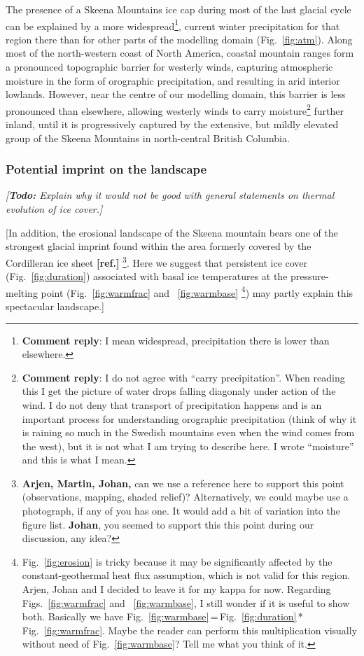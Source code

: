 \documentclass[tc, manuscript]{copernicus}
\newcommand{\renote}[1]{\footnote{\textbf{Comment reply}: #1}}
\newcommand{\todo}[1]{\emph{[\textbf{Todo:} #1]}}
\newcommand{\aref}[0]{\textbf{[ref.]}}
\begin{document}
The presence of a Skeena Mountains ice cap during most of the last glacial
cycle can be explained by a more widespread\renote{
    I mean widespread, precipitation there is lower than elsewhere.},
current winter precipitation for that region there than for other parts of the
modelling domain (Fig.~\ref{fig:atm}). Along most of the north-western coast of
North America, coastal mountain ranges form a pronounced topographic barrier
for westerly winds, capturing atmospheric moisture in the form of orographic
precipitation, and resulting in arid interior lowlands. However, near the
centre of our modelling domain, this barrier is less pronounced than elsewhere,
allowing westerly winds to carry moisture\renote{
    I do not agree with ``carry precipitation''. When reading this I get the
    picture of water drops falling diagonaly under action of the wind. I do not
    deny that transport of precipitation happens and
    is an important process for understanding orographic
    precipitation (think of why it is raining so much in the Swedish mountains
    even when the wind comes from the west), but it is not what I am trying to
    describe here. I wrote ``moisture'' and this is what I mean.}
further inland, until it is progressively captured by the extensive, but mildly
elevated group of the Skeena Mountains in north-central British Columbia.

\subsubsection{Potential imprint on the landscape}

\todo{Explain why it would not be good with general statements on thermal
      evolution of ice cover.}

[In addition, the erosional landscape of the Skeena mountain bears one of the
strongest glacial imprint found within the area formerly covered by the
Cordilleran ice sheet \aref%
\footnote{\textbf{Arjen, Martin, Johan,} can we use a reference here to support
    this point (observations, mapping, shaded relief)? Alternatively, we could
    maybe use a photograph, if any of you has one. It would add a bit of
    variation into the figure list. \textbf{Johan}, you seemed to support this
    this point during our discussion, any idea?}.
Here we suggest that persistent ice cover (Fig.~\ref{fig:duration})
associated with basal ice temperatures at the pressure-melting point
(Fig.~\ref{fig:warmfrac} and ~\ref{fig:warmbase}%
\footnote{Fig.~\ref{fig:erosion} is tricky because it may be significantly
    affected by the constant-geothermal heat flux assumption, which is not
    valid for this region. Arjen, Johan and I decided to leave it for my kappa
    for now. Regarding Figs.~\ref{fig:warmfrac} and ~\ref{fig:warmbase}, I
    still wonder if it is useful to show both. Basically we have
    Fig.~\ref{fig:warmbase}\,=\,Fig.~\ref{fig:duration}\,*\,Fig.~\ref{fig:warmfrac}.
    Maybe the reader can perform this multiplication visually without need of
    Fig.~\ref{fig:warmbase}? Tell me what you think of it.})
may partly explain this spectacular landscape.]
\end{document}
